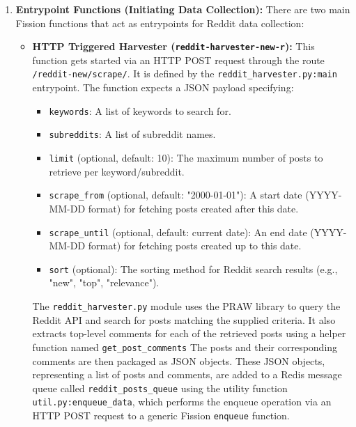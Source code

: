 \documentclass[]{article}
\numberwithin{equation}{section}
\begin{document}
\begin{enumerate}
    \item \textbf{Entrypoint Functions (Initiating Data Collection):} 
    There are two main Fission functions that act as entrypoints for Reddit data collection:

    \begin{itemize}
        \item \textbf{HTTP Triggered Harvester (\texttt{reddit-harvester-new-r}):}
            This function gets started via an HTTP POST request through the route  \texttt{/reddit-new/scrape/}.
            It is defined by the \newline \texttt{reddit\_harvester.py:main} entrypoint.
            The function expects a JSON payload specifying:
            \begin{itemize}
                \item \texttt{keywords}: A list of keywords to search for.
                \item \texttt{subreddits}: A list of subreddit names.
                \item \texttt{limit} (optional, default: 10): The maximum number of posts to retrieve per keyword/subreddit.
                \item \texttt{scrape\_from} (optional, default: "2000-01-01"): A start date (YYYY-MM-DD format) for fetching posts created after this date.
                \item \texttt{scrape\_until} (optional, default: current date): An end date (YYYY-MM-DD format) for fetching posts created up to this date.
                \item \texttt{sort} (optional): The sorting method for Reddit search results (e.g., "new", "top", "relevance").
            \end{itemize}
            The \texttt{reddit\_harvester.py} module uses the PRAW library to query the Reddit API and search for posts matching the supplied criteria. It also extracts top-level comments for each of the retrieved posts using a helper function named  \texttt{get\_post\_comments}
            The posts and their corresponding comments are then packaged as JSON objects. These JSON objects, representing a list of posts and comments, are added to a Redis message queue called \texttt{reddit\_posts\_queue} using the utility function \texttt{util.py:enqueue\_data}, which performs the enqueue operation via an HTTP POST request to a generic Fission \texttt{enqueue} function.


\end{itemize}
\end{enumerate}
\end{document}
